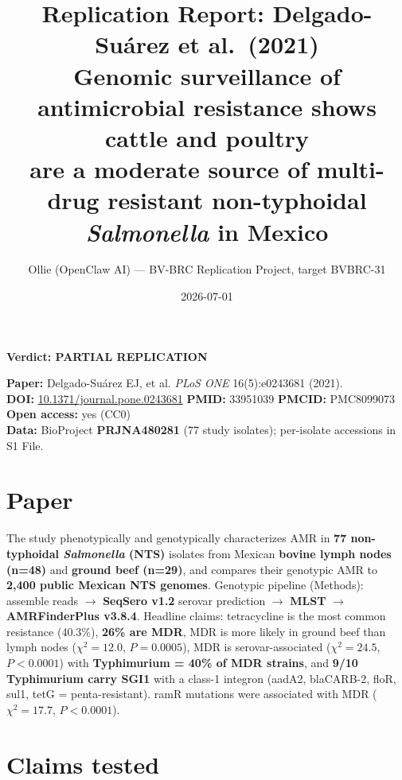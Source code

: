 \documentclass[11pt]{article}
\title{Replication Report: Delgado-Su\'arez et al.\ (2021)\\
\large Genomic surveillance of antimicrobial resistance shows cattle and poultry\\
are a moderate source of multi-drug resistant non-typhoidal \emph{Salmonella} in Mexico}
\author{Ollie (OpenClaw AI) --- BV-BRC Replication Project, target BVBRC-31}
\date{2026-07-01}
\begin{document}
\maketitle

\begin{center}
\textbf{Verdict: PARTIAL REPLICATION}
\end{center}

\noindent\textbf{Paper:} Delgado-Su\'arez EJ, et al. \emph{PLoS ONE} 16(5):e0243681 (2021).\\
\textbf{DOI:} \href{https://doi.org/10.1371/journal.pone.0243681}{10.1371/journal.pone.0243681} \quad
\textbf{PMID:} 33951039 \quad \textbf{PMCID:} PMC8099073 \quad \textbf{Open access:} yes (CC0)\\
\textbf{Data:} BioProject \textbf{PRJNA480281} (77 study isolates); per-isolate accessions in S1 File.

\section{Paper}

The study phenotypically and genotypically characterizes AMR in \textbf{77 non-typhoidal \emph{Salmonella} (NTS)}
isolates from Mexican \textbf{bovine lymph nodes (n=48)} and \textbf{ground beef (n=29)}, and compares their
genotypic AMR to \textbf{2{,}400 public Mexican NTS genomes}. Genotypic pipeline (Methods): assemble reads
$\to$ \textbf{SeqSero v1.2} serovar prediction $\to$ \textbf{MLST} $\to$ \textbf{AMRFinderPlus v3.8.4}.
Headline claims: tetracycline is the most common resistance (40.3\%), \textbf{26\% are MDR}, MDR is more likely
in ground beef than lymph nodes ($\chi^2=12.0$, $P=0.0005$), MDR is serovar-associated ($\chi^2=24.5$, $P<0.0001$)
with \textbf{Typhimurium = 40\% of MDR strains}, and \textbf{9/10 Typhimurium carry SGI1} with a class-1 integron
(aadA2, blaCARB-2, floR, sul1, tetG = penta-resistant). ramR mutations were associated with MDR
($\chi^2=17.7$, $P<0.0001$).

\section{Claims tested}
\end{document}
